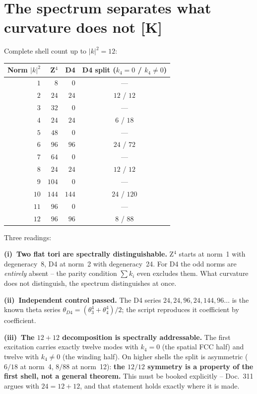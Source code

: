 \chapter{The spectrum separates what curvature does not [K]}

Complete shell count up to $|k|^2 = 12$:

\begin{center}
\begin{tabular}{rrrc}
\toprule
Norm $|k|^2$ & Z$^4$ & D4 & D4 split ($k_4{=}0$ / $k_4{\ne}0$) \\
\midrule
$1$ & $8$ & $0$ & --- \\
$2$ & $24$ & $24$ & $12$ / $12$ \\
$3$ & $32$ & $0$ & --- \\
$4$ & $24$ & $24$ & $6$ / $18$ \\
$5$ & $48$ & $0$ & --- \\
$6$ & $96$ & $96$ & $24$ / $72$ \\
$7$ & $64$ & $0$ & --- \\
$8$ & $24$ & $24$ & $12$ / $12$ \\
$9$ & $104$ & $0$ & --- \\
$10$ & $144$ & $144$ & $24$ / $120$ \\
$11$ & $96$ & $0$ & --- \\
$12$ & $96$ & $96$ & $8$ / $88$ \\
\bottomrule
\end{tabular}
\end{center}

Three readings:

\textbf{(i)~Two flat tori are spectrally distinguishable.} Z$^4$
starts at norm~1 with degeneracy~8, D4 at norm~2 with degeneracy~24.
For D4 the odd norms are \emph{entirely} absent -- the parity
condition $\sum k_i$ even excludes them. What curvature does not
distinguish, the spectrum distinguishes at once.

\textbf{(ii)~Independent control passed.} The D4 series
$24, 24, 96, 24, 144, 96 \dots$ is the known theta series
$\theta_{D4} = (\theta_3^4 + \theta_4^4)/2$; the script reproduces
it coefficient by coefficient.

\textbf{(iii)~The $12+12$ decomposition is spectrally
addressable.} The first excitation carries exactly twelve modes with
$k_4 = 0$ (the spatial FCC half) and twelve with $k_4 \ne 0$ (the
winding half). On higher shells the split is asymmetric ($6/18$ at
norm~4, $8/88$ at norm~12): \textbf{the $12/12$ symmetry is a
property of the first shell, not a general theorem.} This must be
booked explicitly -- Doc.~311 argues with $24 = 12+12$, and that
statement holds exactly where it is made.

